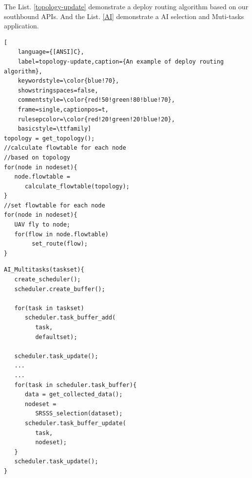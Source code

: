 The List. \ref{topology-update} demonstrate a deploy routing algorithm based on our southbound APIs. 
And the List. \ref{AI} demonstrate a AI selection and Muti-tasks application.

\begin{lstlisting}[
	language={[ANSI]C},
	label=topology-update,caption={An example of deploy routing algorithm},
	keywordstyle=\color{blue!70},
	showstringspaces=false,
	commentstyle=\color{red!50!green!80!blue!70},
	frame=single,captionpos=t,
	rulesepcolor=\color{red!20!green!20!blue!20},
	basicstyle=\ttfamily]
topology = get_topology();
//calculate flowtable for each node
//based on topology
for(node in nodeset){
   node.flowtable =
      calculate_flowtable(topology);
}
//set flowtable for each node
for(node in nodeset){
   UAV fly to node;
   for(flow in node.flowtable)
        set_route(flow);
}

\end{lstlisting}

\begin{lstlisting}[language={[ANSI]C},label=AI,
	caption={An example of AI selection and Muti-tasks},
	keywordstyle=\color{blue!70},
	showstringspaces=false,
	commentstyle=\color{red!50!green!80!blue!70},
	frame=single,captionpos=t,
	rulesepcolor=\color{red!20!green!20!blue!20},
	basicstyle=\ttfamily]
AI_Multitasks(taskset){
   create_scheduler();
   scheduler.create_buffer();

   for(task in taskset)
      scheduler.task_buffer_add(
         task,
         defaultset);

   scheduler.task_update();
   ...
   ...
   for(task in scheduler.task_buffer){
      data = get_collected_data();
      nodeset =
         SRSSS_selection(dataset);
      scheduler.task_buffer_update(
         task,
         nodeset);
   }
   scheduler.task_update();
}

\end{lstlisting}

